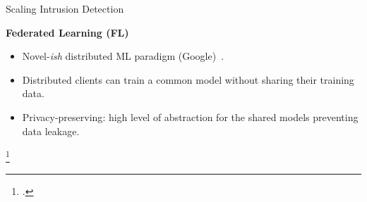 \begin{frame}{Scaling Intrusion Detection}

  \textbf{Federated Learning (FL)}
  
  \begin{itemize}[<+->]
    \item Novel-\textit{ish} distributed ML paradigm (Google)~\autocite{mcmahan_Communicationefficientlearningdeep_2017}.
    \item Distributed clients can train a common model without sharing their training data.
    \item \alert{Privacy-preserving}: high level of abstraction for the shared models preventing data leakage.
  \end{itemize}

  \footcite*{mcmahan_Communicationefficientlearningdeep_2017}
\end{frame}





    



